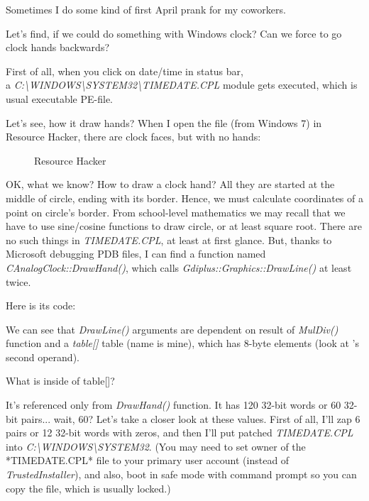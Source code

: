 
Sometimes I do some kind of first April prank for my coworkers.

Let's find, if we could do something with Windows clock?
Can we force to go clock hands backwards?

First of all, when you click on date/time in status bar,\\
a \emph{C:\textbackslash{}WINDOWS\textbackslash{}SYSTEM32\textbackslash{}TIMEDATE.CPL} module gets executed,
which is usual executable \ac{PE}-file.

Let's see, how it draw hands?
When I open the file (from Windows 7) in Resource Hacker, there are clock faces, but with no hands:

\begin{figure}[H]
\centering
{}
\caption{Resource Hacker}
\end{figure}

OK, what we know? How to draw a clock hand? All they are started at the middle of circle, ending with its border.
Hence, we must calculate coordinates of a point on circle's border.
From school-level mathematics we may recall that we have to use sine/cosine functions to draw circle, or at least
square root.
There are no such things in \emph{TIMEDATE.CPL}, at least at first glance.
But, thanks to Microsoft debugging PDB files, I can find a function named \emph{CAnalogClock::DrawHand()}, which calls
\emph{Gdiplus::Graphics::DrawLine()} at least twice.

Here is its code:



We can see that \emph{DrawLine()} arguments are dependent on result of \emph{MulDiv()} function
and a \emph{table[]} table (name is mine),
which has 8-byte elements (look at 's second operand).

What is inside of table[]?



It's referenced only from \emph{DrawHand()} function.
It has 120 32-bit words or 60 32-bit pairs... wait, 60?
Let's take a closer look at these values.
First of all, I'll zap 6 pairs or 12 32-bit words with zeros, and then I'll put patched \emph{TIMEDATE.CPL}
into \emph{C:\textbackslash{}WINDOWS\textbackslash{}SYSTEM32}.
(You may need to set owner of the *TIMEDATE.CPL* file to your primary user account (instead of \emph{TrustedInstaller}),
and also, boot in safe mode with command prompt so you can copy the file, which is usually locked.)

